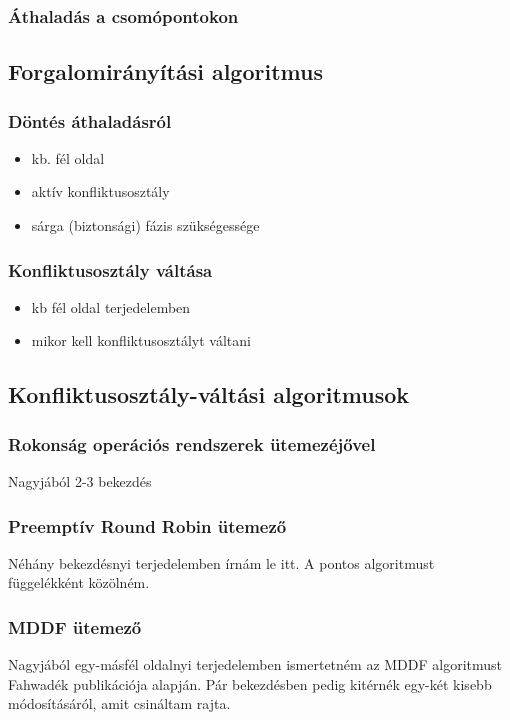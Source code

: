 \documentclass{report}
\begin{document}
			\subsubsection{Áthaladás a csomópontokon}
		\subsection{Forgalomirányítási algoritmus}
			\subsubsection{Döntés áthaladásról}
				\begin{itemize}
					\item kb. fél oldal
					\item aktív konfliktusosztály
					\item sárga (biztonsági) fázis szükségessége
				\end{itemize}
			\subsubsection{Konfliktusosztály váltása}
				\begin{itemize}
					\item kb fél oldal terjedelemben
					\item mikor kell konfliktusosztályt váltani
				\end{itemize}
		\subsection{Konfliktusosztály-váltási algoritmusok}
			\subsubsection{Rokonság operációs rendszerek ütemezéjővel}
				Nagyjából 2-3 bekezdés
			\subsubsection{Preemptív Round Robin ütemező}
				Néhány bekezdésnyi terjedelemben írnám le itt. A pontos algoritmust függelékként közölném.
			\subsubsection{MDDF ütemező}
				Nagyjából egy-másfél oldalnyi terjedelemben ismertetném az MDDF algoritmust Fahwadék publikációja alapján. Pár bekezdésben pedig kitérnék egy-két kisebb módosításáról, amit csináltam rajta.
				
\end{document}
